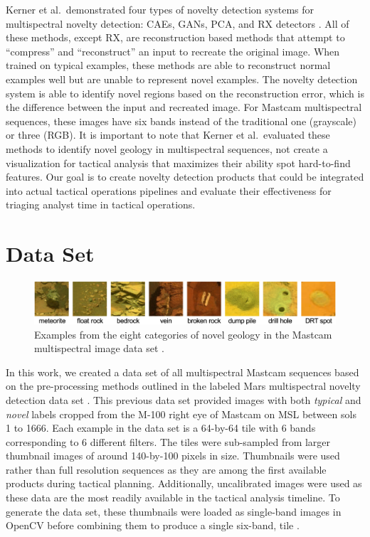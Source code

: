 Kerner et al.~demonstrated four types of novelty detection systems for multispectral novelty detection: CAEs, GANs, PCA, and RX detectors \parencite{kerner2020comparison}. 
All of these methods, except RX, are reconstruction based methods that attempt to ``compress'' and ``reconstruct'' an input to recreate the original image. 
When trained on typical examples, these methods are able to reconstruct normal examples well but are unable to represent novel examples.
The novelty detection system is able to identify novel regions based on the reconstruction error, which is the difference between the input and recreated image.
For Mastcam multispectral sequences, these images have six bands instead of the traditional one (grayscale) or three (RGB). 
It is important to note that Kerner et al.~evaluated these methods to identify novel geology in multispectral sequences, not create a visualization for tactical analysis that maximizes their ability spot hard-to-find features. 
Our goal is to create novelty detection products that could be integrated into actual tactical operations pipelines and evaluate their effectiveness for triaging analyst time in tactical operations.

\section{Data Set}
\begin{figure}
\centering
\includegraphics[width=\linewidth]{figs/msl/categories.png}
\caption[Novel Geology Categories for Mastcam Multispectral Images]{Examples from the eight categories of novel geology in the Mastcam multispectral image data set \protect\parencite{kerner_data}.}
\label{msl/fig:NovelCategories}
\end{figure}

In this work, we created a data set of all multispectral Mastcam sequences based on the pre-processing methods outlined in the labeled Mars multispectral novelty detection data set \parencite{kerner_data}.
This previous data set provided images with both \textit{typical} and \textit{novel} labels cropped from the M-100 right eye of Mastcam on MSL between sols 1 to 1666.
Each example in the data set is a 64-by-64 tile with 6 bands corresponding to 6 different filters.
The tiles were sub-sampled from larger thumbnail images of around 140-by-100 pixels in size. 
Thumbnails were used rather than full resolution sequences as they are among the first available products during tactical planning. 
Additionally, uncalibrated images were used as these data are the most readily available in the tactical analysis timeline. 
To generate the data set, these thumbnails were loaded as single-band images in OpenCV before combining them to produce a single six-band, tile \parencite{opencv_library}.

